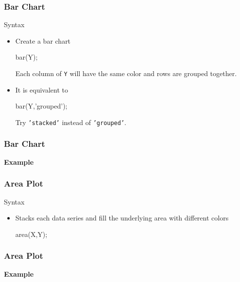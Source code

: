 \documentclass{beamer}  %
\begin{document}
\begin{frame}[fragile]
\frametitle{Bar Chart}

\begin{block}{Syntax}
\begin{itemize}[<+->]
    \item Create a bar chart
          \begin{matlabcodebeamer}[numbers=none,frame=none]
          bar(Y);
          \end{matlabcodebeamer}
          Each column of \texttt{Y} will have the same color and rows are grouped together.
    \item It is equivalent to
          \begin{matlabcodebeamer}[numbers=none,frame=none]
          bar(Y,'grouped');
          \end{matlabcodebeamer}
          Try \texttt{'stacked'} instead of \texttt{'grouped'}.
\end{itemize}
\end{block}

\end{frame}
\begin{frame}[fragile]
\frametitle{Bar Chart}
\textbf{Example} 

\setcounter{subfigure}{0}
\begin{figure}
    \centering
\end{figure}

\end{frame}
\begin{frame}[fragile]
\frametitle{Area Plot}

\begin{block}{Syntax}
\begin{itemize}
    \item Stacks each data series and fill the underlying area with different colors
          \begin{matlabcodebeamer}[numbers=none,frame=none]
          area(X,Y);
          \end{matlabcodebeamer}
\end{itemize}
\end{block}

\end{frame}
\begin{frame}[fragile]
\frametitle{Area Plot}
\textbf{Example} 

\setcounter{subfigure}{0}
\begin{figure}
    \centering
\end{figure}

\end{frame}
\end{document}
